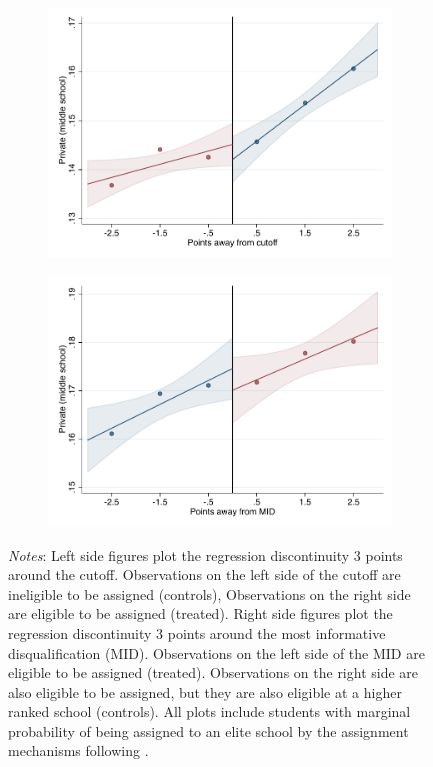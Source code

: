 \documentclass[oneside,11pt]{article}
\begin{document}
\begin{figure}[H]
\begin{center}
    \begin{subfigure}{0.475\textwidth}
        \centering
        \includegraphics[width=\textwidth]{04_Figures/rd_plot_tau_Secundaria_Privada_UNAM3.pdf}
    \end{subfigure}
    \begin{subfigure}{0.475\textwidth}
        \centering
        \includegraphics[width=\textwidth]{04_Figures/rd_plot_mid_Secundaria_Privada_UNAM3.pdf}
    \end{subfigure}
    \end{center}
    
\footnotesize
\textit{Notes}: Left side figures plot the regression discontinuity 3 points around the cutoff. Observations on the left side of the cutoff are ineligible to be assigned (controls), Observations on the right side are eligible to be assigned (treated). Right side figures plot the regression discontinuity 3 points around the most informative disqualification (MID). Observations on the left side of the MID are eligible to be assigned (treated). Observations on the right side are also eligible to be assigned, but they are also eligible at a higher ranked school (controls). All plots include students with marginal probability of being assigned to an elite school by the assignment mechanisms following \citet{abdulkadirouglu2022breaking}. 
\end{figure}
\end{document}
